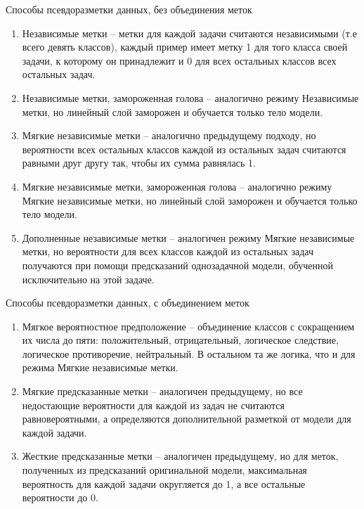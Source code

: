 \begin{frame}{Способы псевдоразметки данных, без объединения меток}
    \begin{enumerate}
\item Независимые метки -- метки для каждой задачи считаются независимыми (т.е всего девять классов), каждый пример имеет метку 1 для того класса своей задачи, к которому он принадлежит и 0 для всех остальных классов всех остальных задач. 
\item Независимые метки, замороженная голова -- аналогично режиму Независимые метки, но линейный слой заморожен и обучается только тело модели.
\item Мягкие независимые метки -- аналогично предыдущему подходу, но вероятности всех остальных классов каждой из остальных задач считаются равными друг другу так, чтобы их сумма равнялась 1. 
\item Мягкие независимые метки, замороженная голова -- аналогично режиму Мягкие независимые метки, но линейный слой заморожен и обучается только тело модели.
\item Дополненные независимые метки -- аналогичен режиму Мягкие независимые метки, но вероятности для всех классов каждой из остальных задач получаются при помощи предсказаний однозадачной модели, обученной исключительно на этой задаче.
    \end{enumerate}
\end{frame}


\begin{frame}{Способы псевдоразметки данных, с объединением меток}
    \begin{enumerate}
\item Мягкое вероятностное предположение -- объединение классов с сокращением их числа до пяти: положительный, отрицательный, логическое следствие, логическое противоречие, нейтральный. В остальном та же логика, что и для режима Мягкие независимые метки.
\item Мягкие предсказанные метки -- аналогичен предыдущему, но все недостающие вероятности для каждой из задач не считаются равновероятными, а определяются дополнительной разметкой от модели для каждой задачи. 
\item Жесткие предсказанные метки -- аналогичен предыдущему, но для меток, полученных из предсказаний оригинальной модели, максимальная вероятность для каждой задачи округляется до 1, а все остальные вероятности до 0.
    \end{enumerate}
\end{frame}

